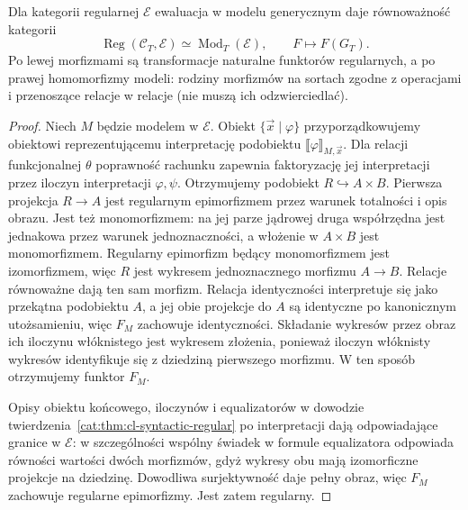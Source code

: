 \begin{twierdzenie}\label{cat:thm:cl-syntactic-universal}
Dla kategorii regularnej $\mathcal E$ ewaluacja w modelu generycznym daje równoważność kategorii
\[
 \operatorname{Reg}(\mathcal C_T,\mathcal E)
 \simeq \operatorname{Mod}_T(\mathcal E),
 \qquad F\longmapsto F(G_T).
\]
Po lewej morfizmami są transformacje naturalne funktorów regularnych, a po prawej homomorfizmy modeli: rodziny morfizmów na sortach zgodne z operacjami i przenoszące relacje w relacje (nie muszą ich odzwierciedlać).
\end{twierdzenie}
\begin{proof}
Niech $M$ będzie modelem w $\mathcal E$. Obiekt $\{\vec x\mid\varphi\}$ przyporządkowujemy obiektowi reprezentującemu interpretację podobiektu $\llbracket\varphi\rrbracket_{M,\vec x}$. Dla relacji funkcjonalnej $\theta$ poprawność rachunku zapewnia faktoryzację jej interpretacji przez iloczyn interpretacji $\varphi,\psi$. Otrzymujemy podobiekt $R\hookrightarrow A\times B$. Pierwsza projekcja $R\to A$ jest regularnym epimorfizmem przez warunek totalności i opis obrazu. Jest też monomorfizmem: na jej parze jądrowej druga współrzędna jest jednakowa przez warunek jednoznaczności, a włożenie w $A\times B$ jest monomorfizmem. Regularny epimorfizm będący monomorfizmem jest izomorfizmem, więc $R$ jest wykresem jednoznacznego morfizmu $A\to B$. Relacje równoważne dają ten sam morfizm. Relacja identyczności interpretuje się jako przekątna podobiektu $A$, a jej obie projekcje do $A$ są identyczne po kanonicznym utożsamieniu, więc $F_M$ zachowuje identyczności. Składanie wykresów przez obraz ich iloczynu włóknistego jest wykresem złożenia, ponieważ iloczyn włóknisty wykresów identyfikuje się z dziedziną pierwszego morfizmu. W ten sposób otrzymujemy funktor $F_M$.

Opisy obiektu końcowego, iloczynów i equalizatorów w dowodzie twierdzenia~\ref{cat:thm:cl-syntactic-regular} po interpretacji dają odpowiadające granice w $\mathcal E$: w szczególności wspólny świadek w formule equalizatora odpowiada równości wartości dwóch morfizmów, gdyż wykresy obu mają izomorficzne projekcje na dziedzinę. Dowodliwa surjektywność daje pełny obraz, więc $F_M$ zachowuje regularne epimorfizmy. Jest zatem regularny.


\end{proof}
